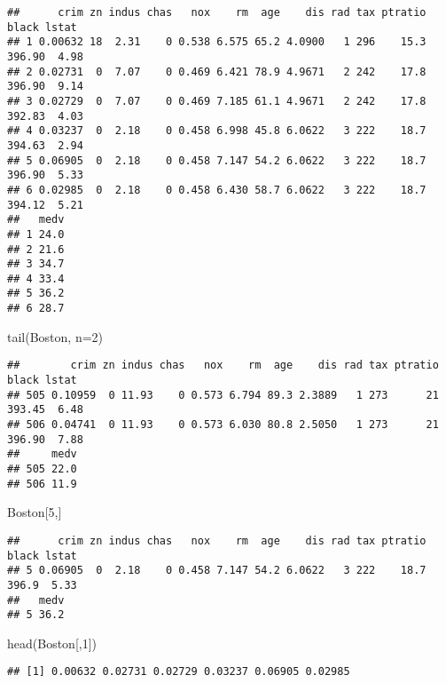 \documentclass[
]{article}
\newenvironment{Shaded}{\begin{snugshade}}{\end{snugshade}}
\newcommand{\AttributeTok}[1]{\textcolor[rgb]{0.77,0.63,0.00}{#1}}
\newcommand{\DecValTok}[1]{\textcolor[rgb]{0.00,0.00,0.81}{#1}}
\newcommand{\FunctionTok}[1]{\textcolor[rgb]{0.00,0.00,0.00}{#1}}
\newcommand{\NormalTok}[1]{#1}
\begin{document}
\begin{verbatim}
##      crim zn indus chas   nox    rm  age    dis rad tax ptratio  black lstat
## 1 0.00632 18  2.31    0 0.538 6.575 65.2 4.0900   1 296    15.3 396.90  4.98
## 2 0.02731  0  7.07    0 0.469 6.421 78.9 4.9671   2 242    17.8 396.90  9.14
## 3 0.02729  0  7.07    0 0.469 7.185 61.1 4.9671   2 242    17.8 392.83  4.03
## 4 0.03237  0  2.18    0 0.458 6.998 45.8 6.0622   3 222    18.7 394.63  2.94
## 5 0.06905  0  2.18    0 0.458 7.147 54.2 6.0622   3 222    18.7 396.90  5.33
## 6 0.02985  0  2.18    0 0.458 6.430 58.7 6.0622   3 222    18.7 394.12  5.21
##   medv
## 1 24.0
## 2 21.6
## 3 34.7
## 4 33.4
## 5 36.2
## 6 28.7
\end{verbatim}

\begin{Shaded}
\begin{Highlighting}[]
\FunctionTok{tail}\NormalTok{(Boston, }\AttributeTok{n=}\DecValTok{2}\NormalTok{)}
\end{Highlighting}
\end{Shaded}

\begin{verbatim}
##        crim zn indus chas   nox    rm  age    dis rad tax ptratio  black lstat
## 505 0.10959  0 11.93    0 0.573 6.794 89.3 2.3889   1 273      21 393.45  6.48
## 506 0.04741  0 11.93    0 0.573 6.030 80.8 2.5050   1 273      21 396.90  7.88
##     medv
## 505 22.0
## 506 11.9
\end{verbatim}

\begin{Shaded}
\begin{Highlighting}[]
\NormalTok{Boston[}\DecValTok{5}\NormalTok{,]}
\end{Highlighting}
\end{Shaded}

\begin{verbatim}
##      crim zn indus chas   nox    rm  age    dis rad tax ptratio black lstat
## 5 0.06905  0  2.18    0 0.458 7.147 54.2 6.0622   3 222    18.7 396.9  5.33
##   medv
## 5 36.2
\end{verbatim}

\begin{Shaded}
\begin{Highlighting}[]
\FunctionTok{head}\NormalTok{(Boston[,}\DecValTok{1}\NormalTok{])}
\end{Highlighting}
\end{Shaded}

\begin{verbatim}
## [1] 0.00632 0.02731 0.02729 0.03237 0.06905 0.02985
\end{verbatim}
\end{document}
